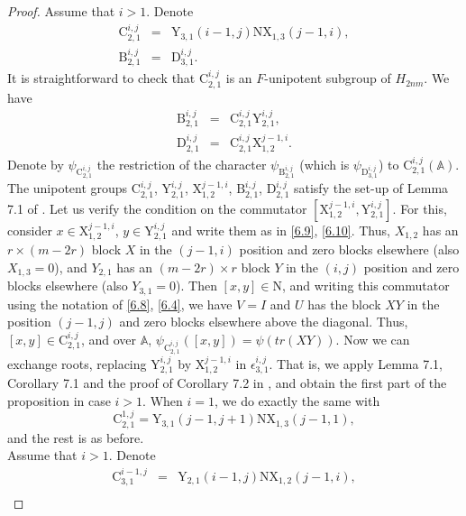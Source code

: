 \documentclass[12pts]{amsart}
\newcommand{\BA}{{\mathbb {A}}}
\begin{document}
\begin{proof}
	Assume that $i>1$. Denote
	$$
	\begin{array}{rcl}
	\mathrm{C}_{2,1}^{i,j}&=&\mathrm{Y}_{3,1}(i-1,j)\mathrm{N}\mathrm{X}_{1,3}(j-1,i),\\
	\mathrm{B}_{2,1}^{i,j}&=&\mathrm{D}_{3,1}^{i,j}.
	\end{array}
	$$
	It is straightforward to check that $\mathrm{C}_{2,1}^{i,j}$ is an
	$F$-unipotent subgroup of $H_{2nm}$. We have
	$$
	\begin{array}{rcl}
	\mathrm{B}_{2,1}^{i,j}&=&\mathrm{C}_{2,1}^{i,j}\mathrm{Y}_{2,1}^{i,j},\\
	\mathrm{D}_{2,1}^{i,j}&=&\mathrm{C}_{2,1}^{i,j}\mathrm{X}_{1,2}^{j-1,i}.
	\end{array}
	$$
	Denote by $\psi_{\mathrm{C}_{2,1}^{i,j}}$ the
	restriction of the character $\psi_{\mathrm{B}_{2,1}^{i,j}}$ (which
	is $\psi_{\mathrm{D}_{3,1}^{i,j}}$) to $\mathrm{C}_{2,1}^{i,j}(\BA)$. The
	unipotent groups $\mathrm{C}_{2,1}^{i,j}$, $\mathrm{Y}_{2,1}^{i,j}$,
	$\mathrm{X}_{1,2}^{j-1,i}$, $\mathrm{B}_{2,1}^{i,j}$,
	$\mathrm{D}_{2,1}^{i,j}$ satisfy the set-up of Lemma 7.1 of
	\cite{GRS11}. Let us verify the condition on the commutator
	$[\mathrm{X}_{1,2}^{j-1,i},\mathrm{Y}_{2,1}^{i,j}]$. For this,
	consider $x\in \mathrm{X}_{1,2}^{j-1,i}$, $y\in
	\mathrm{Y}_{2,1}^{i,j}$ and write them as in \eqref{6.9},
	\eqref{6.10}. Thus, $X_{1,2}$ has an $r\times (m-2r)$ block $X$ in the
	$(j-1,i)$ position and zero blocks elsewhere (also $X_{1,3}=0$), and
	$Y_{2,1}$ has an $(m-2r)\times r$ block $Y$ in the $(i,j)$ position and zero
	blocks elsewhere (also $Y_{3,1}=0$). Then $[x,y]\in \mathrm{N}$, and
	writing this commutator using the notation of \eqref{6.8},
	\eqref{6.4}, we have $V=I$ and $U$ has the block $XY$ in the
	position $(j-1,j)$ and zero blocks elsewhere above the diagonal.
	Thus, $[x,y]\in \mathrm{C}_{2,1}^{i,j}$, and over $\BA$,
	$\psi_{\mathrm{C}_{2,1}^{i,j}}([x,y])=\psi(tr(XY))$. Now we can exchange
	roots, replacing $\mathrm{Y}_{2,1}^{i,j}$ by
	$\mathrm{X}_{1,2}^{j-1,i}$ in $\epsilon_{3,1}^{i,j}$. That is, we
	apply Lemma 7.1, Corollary 7.1 and the proof of Corollary 7.2 in
	\cite{GRS11}, and obtain the first part of the proposition in case
	$i>1$. When $i=1$, we do exactly the same with
	$$
	\mathrm{C}_{2,1}^{1,j}=\mathrm{Y}_{3,1}(j-1,j+1)\mathrm{N}\mathrm{X}_{1,3}(j-1,1),
	$$
	and the rest is as before.\\
	Assume that $i>1$. Denote
	$$
	\begin{array}{rcl}
	\mathrm{C}_{3,1}^{i-1,j}&=&\mathrm{Y}_{2,1}(i-1,j)\mathrm{N}\mathrm{X}_{1,2}(j-1,i),\\

\end{array}$$
\end{proof}
\end{document}
